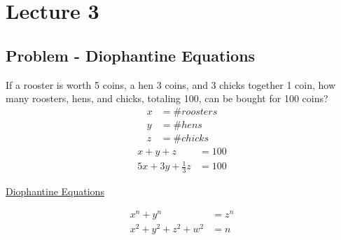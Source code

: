 \chapter{Lecture 3}
\date{September 3, 2024}

\section{Problem - Diophantine Equations}
    If a rooster is worth 5 coins, a hen 3 coins, and 3 chicks together 1 coin,
    how many roosters, hens, and chicks, totaling 100, can be bought for 100 coins?
    \begin{align*}
        x & = \# roosters \\
        y & = \# hens \\
        z & = \# chicks 
    \end{align*}
    \begin{align*}
        x+y+z & = 100 \\
        5x + 3y + \frac{1}{3}z & = 100
    \end{align*}
    \begin{center}
        \underline{Diophantine Equations}
    \end{center}
    \begin{align*}
        x^n+y^n & = z^n \\
        x^2+y^2+z^2+w^2 & = n
    \end{align*}

